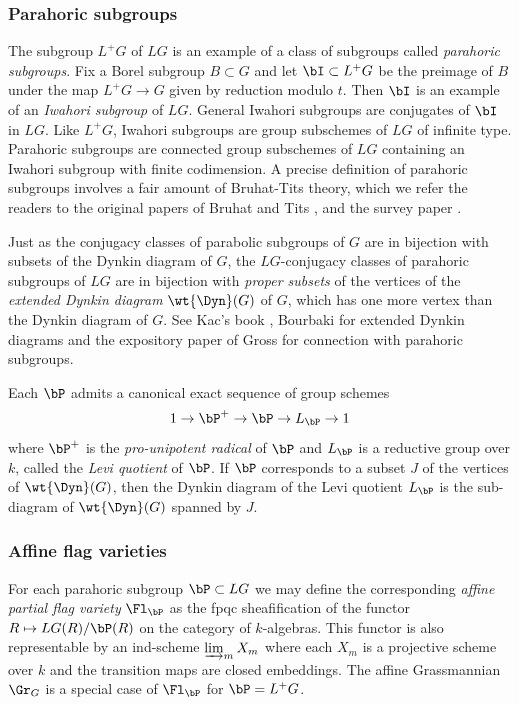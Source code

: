 \subsubsection{Parahoric subgroups} The subgroup $L^{+}G$ of $LG$ is an example of a class of subgroups called {\em parahoric subgroups}.  Fix a Borel subgroup $B\subset G$ and let $\bI\subset L^{+}G$ be the preimage of $B$ under the map $L^{+}G\to G$ given by reduction modulo $t$. Then $\bI$ is an example of an {\em Iwahori subgroup} of $LG$. General Iwahori subgroups are conjugates of $\bI$ in $LG$. Like $L^{+}G$, Iwahori subgroups are group subschemes of $LG$ of infinite type. Parahoric subgroups are connected group subschemes of $LG$ containing an Iwahori subgroup with finite codimension. A precise definition of parahoric subgroups involves a fair amount of Bruhat-Tits theory, which we refer the readers to the original papers of Bruhat and Tits \cite{BT1}, and the survey paper \cite{Tits}. 

Just as the conjugacy classes of parabolic subgroups of $G$ are in bijection with subsets of the Dynkin diagram of $G$, the $LG$-conjugacy classes of parahoric subgroups of $LG$ are in bijection with {\em proper subsets} of the vertices of the {\em extended Dynkin diagram} $\wt{\Dyn}(G)$ of $G$, which has one more vertex than the Dynkin diagram of $G$. See Kac's book \cite[\S4.8]{Kac}, Bourbaki \cite[Ch VI]{Bourbaki} for extended Dynkin diagrams and the expository paper of Gross \cite{Gross} for connection with parahoric subgroups. 

Each $\bP$ admits a canonical exact sequence of group schemes
\begin{equation*}
1\to \bP^{+}\to \bP\to L_{\bP}\to1
\end{equation*}
where $\bP^{+}$ is the {\em pro-unipotent radical} of $\bP$ and $L_{\bP}$ is a reductive group over $k$, called the {\em Levi quotient} of $\bP$. If $\bP$ corresponds to a subset $J$ of the vertices of $\wt{\Dyn}(G)$, then the Dynkin diagram of the Levi quotient $L_{\bP}$ is the sub-diagram of $\wt{\Dyn}(G)$ spanned by $J$.





\subsubsection{Affine flag varieties} For each parahoric subgroup $\bP\subset LG$ we may define the corresponding {\em affine partial flag variety} $\Fl_{\bP}$ as the fpqc sheafification of the functor $R\mapsto LG(R)/\bP(R)$ on the category of $k$-algebras. This functor is also representable by an ind-scheme $\varinjlim_{m}X_{m}$ where each $X_{m}$ is a projective scheme over $k$ and the transition maps are closed embeddings.  The affine Grassmannian $\Gr_{G}$ is a special case of $\Fl_{\bP}$ for $\bP=L^{+}G$.

